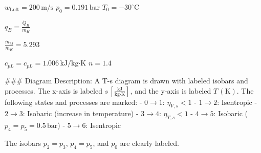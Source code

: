 \( w_{\text{Luft}} = 200 \, \text{m/s} \)  
\( p_0 = 0.191 \, \text{bar} \)  
\( T_0 = -30^\circ \text{C} \)  

\( q_B = \frac{\dot{Q}_B}{\dot{m}_K} \)  

\( \frac{\dot{m}_M}{\dot{m}_K} = 5.293 \)  

\( c_{pL} = c_{pL} = 1.006 \, \text{kJ/kg·K} \)  
\( n = 1.4 \)  

### Diagram Description:  
A T-s diagram is drawn with labeled isobars and processes. The x-axis is labeled \( s \, \left[ \frac{\text{kJ}}{\text{kg·K}} \right] \), and the y-axis is labeled \( T \, (\text{K}) \).  
The following states and processes are marked:  
- \( 0 \to 1 \): \( \eta_{V,s} < 1 \)  
- \( 1 \to 2 \): Isentropic  
- \( 2 \to 3 \): Isobaric (increase in temperature)  
- \( 3 \to 4 \): \( \eta_{T,s} < 1 \)  
- \( 4 \to 5 \): Isobaric (\( p_4 = p_5 = 0.5 \, \text{bar} \))  
- \( 5 \to 6 \): Isentropic  

The isobars \( p_2 = p_3 \), \( p_4 = p_5 \), and \( p_0 \) are clearly labeled.